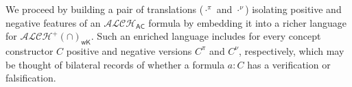 \documentclass[letterpaper]{article} %
\theoremstyle{definition}
\theoremstyle{definition}
\theoremstyle{definition}
\theoremstyle{definition}
\theoremstyle{definition}
\begin{document}
We proceed by building a pair of translations ($\cdot^{\pi}$ and $\cdot^{\nu}$) isolating positive and negative features of an $\mathcal{ALCH}_{\mathsf{AC}}$ formula by embedding it into a richer language for $\mathcal{ALCH}^+(\cap)_{\mathsf{wK}}$. Such an enriched language includes for every concept constructor $C$ positive and negative versions $C^{\pi}$ and $C^{\nu}$, respectively, which may be thought of bilateral records of whether a formula $a:C$ has a verification or falsification. 




\end{document}
